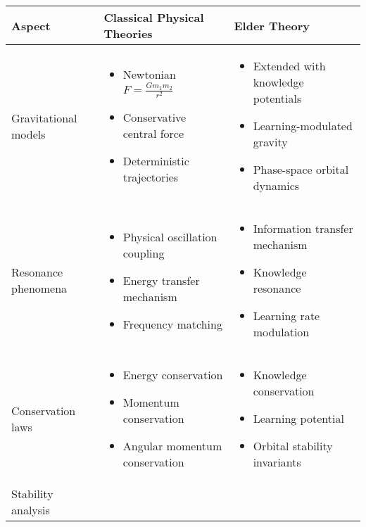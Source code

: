 \begin{table}[h]
\centering
\begin{tabular}{|p{3cm}|p{5cm}|p{5cm}|}
\hline
\textbf{Aspect} & \textbf{Classical Physical Theories} & \textbf{Elder Theory} \\
\hline
Gravitational models & 
\begin{itemize}
    \item Newtonian $F = \frac{Gm_1m_2}{r^2}$
    \item Conservative central force
    \item Deterministic trajectories
\end{itemize} &
\begin{itemize}
    \item Extended with knowledge potentials
    \item Learning-modulated gravity
    \item Phase-space orbital dynamics
\end{itemize} \\
\hline
Resonance phenomena & 
\begin{itemize}
    \item Physical oscillation coupling
    \item Energy transfer mechanism
    \item Frequency matching
\end{itemize} &
\begin{itemize}
    \item Information transfer mechanism
    \item Knowledge resonance
    \item Learning rate modulation
\end{itemize} \\
\hline
Conservation laws & 
\begin{itemize}
    \item Energy conservation
    \item Momentum conservation
    \item Angular momentum conservation
\end{itemize} &
\begin{itemize}
    \item Knowledge conservation
    \item Learning potential
    \item Orbital stability invariants
\end{itemize} \\
\hline
Stability analysis & 
\begin{itemize}

\end{itemize}
\end{tabular}
\end{table}
